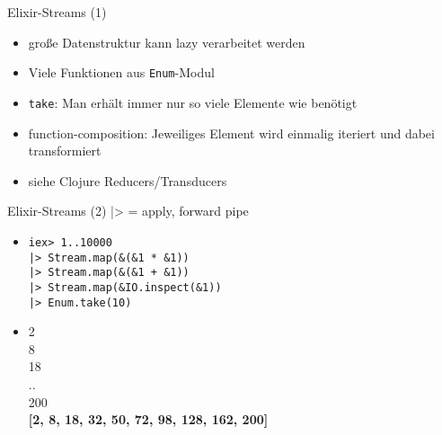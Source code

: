 \documentclass[compress]{beamer}
\begin{document}

  \begin{frame}{Elixir-Streams (1)}
    \begin{itemize}
      \item große Datenstruktur kann lazy verarbeitet werden
      \item Viele Funktionen aus \texttt{Enum}-Modul 
      \item \texttt{take}: Man erhält immer nur so viele Elemente wie benötigt
      \item function-composition: Jeweiliges Element wird einmalig iteriert und dabei transformiert
      \item siehe Clojure Reducers/Transducers
    \end{itemize}
  \end{frame}


  \begin{frame}{Elixir-Streams (2)}
    |> = apply, forward pipe
    \begin{itemize}[<+->]
      \item \texttt{iex> 1..10000 \\|> Stream.map(\&(\&1 * \&1)) \\|> Stream.map(\&(\&1 + \&1))\\ |> Stream.map(\&IO.inspect(\&1))\\ |> Enum.take(10)} \\
      \item 2\\8\\18\\..\\200\\
        \textbf{[2, 8, 18, 32, 50, 72, 98, 128, 162, 200]}
    \end{itemize}
  \end{frame}
  
\end{document}

